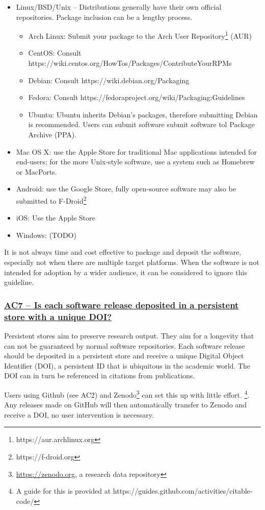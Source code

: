 \documentclass[a4paper,11pt]{article}
\newcommand{\indicator}[1]{\subsubsection*{\underline{#1}}}
\begin{document}
\begin{itemize}
    \item Linux/BSD/Unix -- Distributions generally have their own official repositories. Package inclusion can be a lengthy process.
    \begin{itemize}
        \item Arch Linux: Submit your package to the Arch User Repository\footnote{https://aur.archlinux.org} (AUR)
		\item CentOS: Consult https://wiki.centos.org/HowTos/Packages/ContributeYourRPMs
        \item Debian: Consult https://wiki.debian.org/Packaging
        \item Fedora: Consult https://fedoraproject.org/wiki/Packaging:Guidelines
        \item Ubuntu: Ubuntu inherits Debian's packages, therefore submitting Debian is recommended. Users can submit software submit software tol Package Archive (PPA).
    \end{itemize}
    \item Mac OS X: use the Apple Store for traditional Mac applications intended for end-users; for the more Unix-style
        software, use a system such as Homebrew or MacPorts.
    \item Android: use the Google Store, fully open-source software may also be submitted to F-Droid\footnote{https://f-droid.org}
    \item iOS: Use the Apple Store
    \item Windows: (TODO) 
\end{itemize}

It is not always time and cost effective to package and deposit the software,
especially not when there are multiple target platforms. When the software is
not intended for adoption by a wider audience, it can be considered to ignore
this guideline.

\indicator{AC7 -- Is each software release deposited in a persistent store with a unique DOI?}

Persistent stores aim to preserve research output. They aim for a longevity
that can not be guaranteed by normal software repositories. Each software
release should be deposited in a persistent store and receive a unique Digital
Object Identifier (DOI),  a persistent ID that is ubiquitous in the academic
world. The DOI can in turn be referenced in citations from publications.

Users using Github (see AC2) and Zenodo\footnote{\url{https://zenodo.org}, a
research data repository} can set this up with little effort. \footnote{A guide
for this is provided at https://guides.github.com/activities/citable-code/}.
Any releases made on GitHub will then automatically transfer to Zenodo and
receive a DOI, no user intervention is necessary. 
\end{document}
